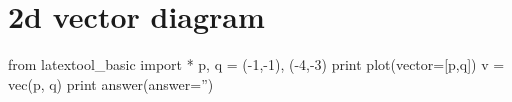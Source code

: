 \section{2d vector diagram}

\begin{python}
from latextool_basic import *
p, q = (-1,-1), (-4,-3)
print plot(vector=[p,q])
v = vec(p, q)
print answer(answer='')
\end{python}
